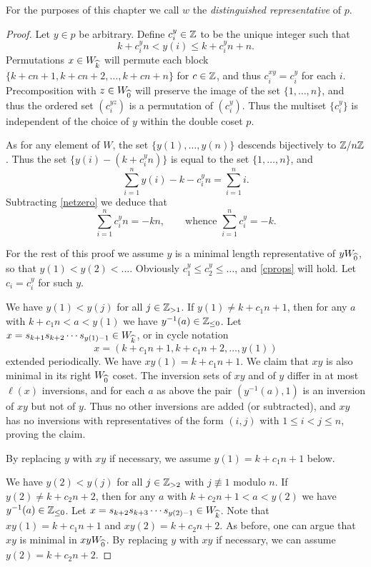For the purposes of this chapter we call $w$ the \emph{distinguished representative} of $p$.

\begin{proof} 
Let $y \in p$ be arbitrary. Define $c^y_i \in \mathbb{Z}$ to be the unique integer such that 
\[ k + c^y_i n < y(i) \le k + c^y_i n + n.\] Permutations $x \in W_{\widehat{k}}$ will permute each block $\{k + c n + 1, k + cn + 2, \ldots, k + cn + n\}$ for $c \in \mathbb{Z}$, and thus $c^{xy}_i = c^y_i$ for each $i$. Precomposition with $z \in W_{\widehat{0}}$ will preserve the image of the set $\{1, \ldots, n\}$, and thus the ordered set $(c^{yz}_i)$ is a permutation of $(c^y_i)$. Thus the multiset $\{c^y_i\}$ is independent of the choice of $y$ within the double coset $p$.

As for any element of $W$, the set $\{y(1), \ldots, y(n)\}$ descends bijectively to $\mathbb{Z}/n\mathbb{Z}$. Thus the set $\{y(i) - (k+c^y_i n)\}$ is equal to the set $\{1, \ldots, n\}$, and
\begin{equation} \sum_{i=1}^n y(i) - k - c^y_i n = \sum_{i=1}^n i.\end{equation}
Subtracting \eqref{netzero} we deduce that
\begin{equation} \sum_{i=1}^n c^y_i n = -kn, \qquad \text{whence } \sum_{i=1}^n c^y_i = -k.\end{equation}

For the rest of this proof we assume $y$ is a minimal length representative of $y W_{\widehat{0}}$, so that $y(1) < y(2) < \ldots$. Obviously $c^y_1 \le c^y_2 \le \ldots$, and \eqref{cprops} will hold. Let $c_i = c^y_i$ for such $y$.

We have $y(1) < y(j)$ for all $j \in \mathbb{Z}_{> 1}$. If $y(1) \ne k + c_1 n + 1$, then for any $a$ with $k+c_1 n < a < y(1)$ we have $y^{-1}(a) \in \mathbb{Z}_{\le 0}$. Let $x = s_{k+1} s_{k+2} \cdots s_{y(1) - 1} \in W_{\widehat{k}}$, or in cycle notation
\[ x = (k + c_1 n + 1, k + c_1 n + 2, \ldots, y(1)) \]
extended periodically. We have $xy(1) = k + c_1 n + 1$. We claim that $xy$ is also minimal in its right $W_{\widehat{0}}$ coset. The inversion sets of $xy$ and of $y$ differ in at most $\ell(x)$ inversions, and for each $a$ as above the pair $(y^{-1}(a),1)$ is an inversion of $xy$ but not of $y$. Thus no other inversions are added (or subtracted), and $xy$ has no inversions with representatives of the form $(i,j)$ with $1 \le i < j \le n$, proving the claim. 

By replacing $y$ with $xy$ if necessary, we assume $y(1) = k + c_1 n + 1$ below.

We have $y(2) < y(j)$ for all $j \in \mathbb{Z}_{> 2}$ with $j \not\equiv 1$ modulo $n$. If $y(2) \ne k + c_2 n + 2$, then for any $a$ with $k+c_2 n + 1 < a < y(2)$ we have $y^{-1}(a) \in \mathbb{Z}_{\le 0}$. Let $x = s_{k+2} s_{k+3} \cdots s_{y(2) - 1} \in W_{\widehat{k}}$. Note that $xy(1) = k + c_1 n + 1$ and $xy(2) = k + c_2 n + 2$. As before, one can argue that $xy$ is minimal in $xy W_{\widehat{0}}$. By replacing $y$ with $xy$ if necessary, we can assume $y(2) = k + c_2 n + 2$.


\end{proof}

